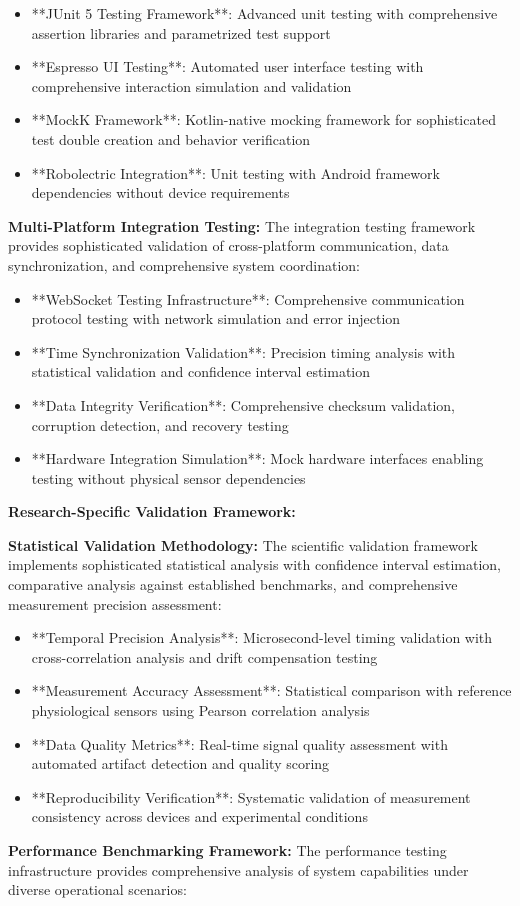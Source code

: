 \documentclass[12pt,a4paper]{report}
\begin{document}
\begin{itemize}
\item **JUnit 5 Testing Framework**: Advanced unit testing with comprehensive assertion libraries and parametrized test
  support
\item **Espresso UI Testing**: Automated user interface testing with comprehensive interaction simulation and validation
\item **MockK Framework**: Kotlin-native mocking framework for sophisticated test double creation and behavior verification
\item **Robolectric Integration**: Unit testing with Android framework dependencies without device requirements

\end{itemize}
\textbf{Multi-Platform Integration Testing:}
The integration testing framework provides sophisticated validation of cross-platform communication, data
synchronization, and comprehensive system coordination:

\begin{itemize}
\item **WebSocket Testing Infrastructure**: Comprehensive communication protocol testing with network simulation and error
  injection
\item **Time Synchronization Validation**: Precision timing analysis with statistical validation and confidence interval
  estimation
\item **Data Integrity Verification**: Comprehensive checksum validation, corruption detection, and recovery testing
\item **Hardware Integration Simulation**: Mock hardware interfaces enabling testing without physical sensor dependencies

\end{itemize}
\textbf{Research-Specific Validation Framework:}

\textbf{Statistical Validation Methodology:}
The scientific validation framework implements sophisticated statistical analysis with confidence interval estimation,
comparative analysis against established benchmarks, and comprehensive measurement precision assessment:

\begin{itemize}
\item **Temporal Precision Analysis**: Microsecond-level timing validation with cross-correlation analysis and drift
  compensation testing
\item **Measurement Accuracy Assessment**: Statistical comparison with reference physiological sensors using Pearson
  correlation analysis
\item **Data Quality Metrics**: Real-time signal quality assessment with automated artifact detection and quality scoring
\item **Reproducibility Verification**: Systematic validation of measurement consistency across devices and experimental
  conditions

\end{itemize}
\textbf{Performance Benchmarking Framework:}
The performance testing infrastructure provides comprehensive analysis of system capabilities under diverse operational
scenarios:
\end{document}
